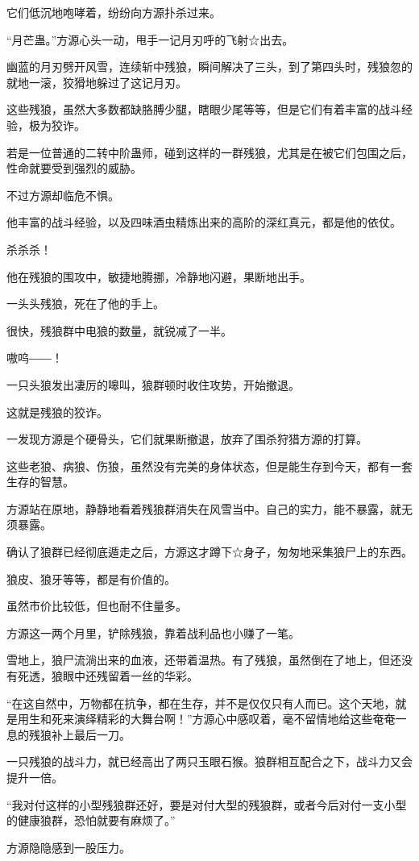 \begin{this_body}
它们低沉地咆哮着，纷纷向方源扑杀过来。

“月芒蛊。”方源心头一动，甩手一记月刃呼的飞射☆出去。

幽蓝的月刃劈开风雪，连续斩中残狼，瞬间解决了三头，到了第四头时，残狼忽的就地一滚，狡猾地躲过了这记月刃。

这些残狼，虽然大多数都缺胳膊少腿，瞎眼少尾等等，但是它们有着丰富的战斗经验，极为狡诈。

若是一位普通的二转中阶蛊师，碰到这样的一群残狼，尤其是在被它们包围之后，性命就要受到强烈的威胁。

不过方源却临危不惧。

他丰富的战斗经验，以及四味酒虫精炼出来的高阶的深红真元，都是他的依仗。

杀杀杀！

他在残狼的围攻中，敏捷地腾挪，冷静地闪避，果断地出手。

一头头残狼，死在了他的手上。

很快，残狼群中电狼的数量，就锐减了一半。

嗷呜――！

一只头狼发出凄厉的嗥叫，狼群顿时收住攻势，开始撤退。

这就是残狼的狡诈。

一发现方源是个硬骨头，它们就果断撤退，放弃了围杀狩猎方源的打算。

这些老狼、病狼、伤狼，虽然没有完美的身体状态，但是能生存到今天，都有一套生存的智慧。

方源站在原地，静静地看着残狼群消失在风雪当中。自己的实力，能不暴露，就无须暴露。

确认了狼群已经彻底遁走之后，方源这才蹲下☆身子，匆匆地采集狼尸上的东西。

狼皮、狼牙等等，都是有价值的。

虽然市价比较低，但也耐不住量多。

方源这一两个月里，铲除残狼，靠着战利品也小赚了一笔。

雪地上，狼尸流淌出来的血液，还带着温热。有了残狼，虽然倒在了地上，但还没有死透，狼眼中还残留着一丝的华彩。

“在这自然中，万物都在抗争，都在生存，并不是仅仅只有人而已。这个天地，就是用生和死来演绎精彩的大舞台啊！”方源心中感叹着，毫不留情地给这些奄奄一息的残狼补上最后一刀。

一只残狼的战斗力，就已经高出了两只玉眼石猴。狼群相互配合之下，战斗力又会提升一倍。

“我对付这样的小型残狼群还好，要是对付大型的残狼群，或者今后对付一支小型的健康狼群，恐怕就要有麻烦了。”

方源隐隐感到一股压力。


\end{this_body}

